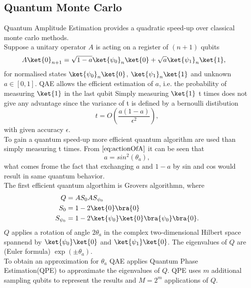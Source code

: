 \documentclass[../../main.tex]{subfiles}
\begin{document}
\subsection{Quantum Monte Carlo}\label{sec: qmc}
Quantum Amplitude Estimation provides a quadratic speed-up over classical monte carlo methods. \\
Suppose a unitary operator $A$ is acting on a register of $(n+1)$ qubits
\begin{align}\label{eq:actionOfA}
  A\ket{0}_{n+1} &= \sqrt{1-a}\ket{\psi_0}_{n}\ket{0}+\sqrt{a}\ket{\psi_1}_{n}\ket{1}, \label{eq:AE_A}
\end{align}
for normalised states $\ket{\psi_0}_{n}\ket{0}$, $\ket{\psi_1}_{n}\ket{1}$ and unknown $a \in [0,1]$.
QAE allows the efficient estimation of $a$, i.e. the probability of measuring $\ket{1}$ in the last qubit
Simply measuring $\ket{1}$ t times does not give any advantage since the variance of t is defined by a bernoulli distibution
\begin{equation}\label{eq:t}
  t = O(\frac{a(1-a)}{\epsilon^2}),
\end{equation}
with given accuracy $\epsilon$.\\
To gain a quantum speed-up more efficient quantum algorithm are used than simply measuring t times. 
From $\ref{eq:actionOfA}$ it can be seen that
\begin{equation}\label{eq:aIsSin}
  a = sin^2(\theta_a),
\end{equation}
what comes frome the fact that exchanging $a \text{ and } 1-a$ by sin and cos would result in same quantum behavior.\\
The first efficient quantum algorthim is Grovers algorithmn, where
\begin{align}
  Q &= AS_0AS_{\psi_0} \nonumber \\
  S_0 &= 1-2\ket{0}\bra{0} \nonumber \\
  S_{\psi_0} &= 1-2\ket{\psi_0}\ket{0}\bra{\psi_0}\bra{0}. \nonumber \\
\end{align}
$Q$ applies a rotation of angle $2\theta_a$ in the complex two-dimensional Hilbert space spannend by $\ket{\psi_0}\ket{0}$ and
$\ket{\psi_1}\ket{0}$. The eigenvalues of $Q$ are (Euler formula) $\exp{ (\pm \theta_a)}$.\\
To obtain an approximation for $\theta_a$ QAE applies Quantum Phase Estimation(QPE) to approximate the eigenvalues of $Q$.
QPE uses $m$ additional sampling qubits to represent the results and $M=2^m$ applications of $Q$.\\
\end{document}
